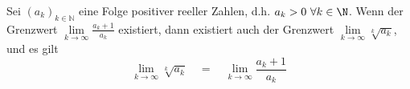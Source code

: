 Sei $(a_k)_{k \in \mathbb{N}}$ eine Folge positiver reeller Zahlen, d.h. $a_k > 0 \ \forall k \in \N$. Wenn der Grenzwert $\lim\limits_{k \to \infty} \frac{a_k+1}{a_k}$ existiert, dann existiert auch der Grenzwert $\lim\limits_{k \to \infty} \sqrt[k]{a_k}$, und es gilt
$$\lim_{k \to \infty} \sqrt[k]{a_k} \quad = \quad \lim_{k \to \infty} \frac{a_k+1}{a_k}$$